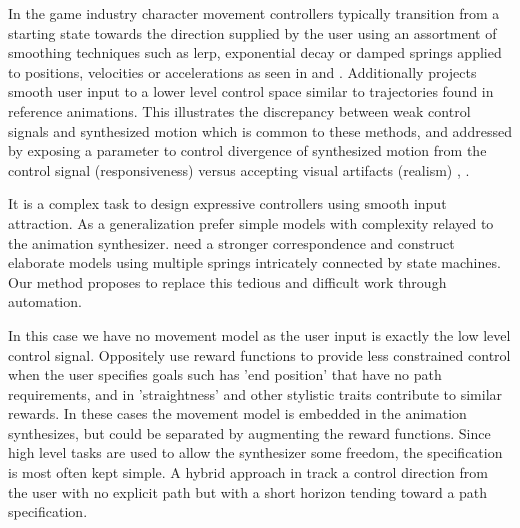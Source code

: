 In the game industry character movement controllers typically transition from a starting state towards the direction supplied by the user using an assortment of smoothing techniques such as lerp, exponential decay or damped springs applied to positions, velocities or accelerations as seen in \citep{buttner20} and \citep{holden21}.  Additionally \citep{startke20} projects smooth user input to a lower level control space similar to trajectories found in reference animations. This illustrates the discrepancy between weak control signals and synthesized motion which is common to these methods, and addressed by exposing a parameter to control divergence of synthesized motion from the control signal (responsiveness) versus accepting visual artifacts (realism) \citep{clavet16}, \citep{zadziuk16}. 

It is a complex task to design expressive controllers using smooth input attraction. As a generalization  prefer simple models with complexity relayed to the animation synthesizer.  need a stronger correspondence and construct elaborate models using multiple springs intricately connected by state machines. Our method proposes to replace this tedious and difficult work through automation. 

 In this case we have no movement model as the user input is exactly the low level control signal. Oppositely \citep{kovar02} use reward functions to provide less constrained control when the user specifies goals such has 'end position' that have no path requirements, and in \citep{lee18} 'straightness' and other stylistic traits contribute to similar rewards. In these cases the movement model is embedded in the animation synthesizes, but could be separated by augmenting the reward functions. Since high level tasks are used to allow the synthesizer some freedom, the specification is most often kept simple. A hybrid approach in \citep{lee10} track a control direction from the user with no explicit path but with a short horizon tending toward a path specification.

